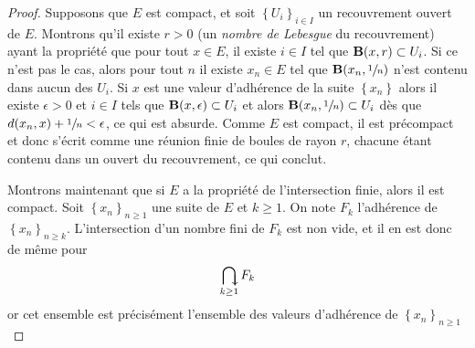\begin{proof}
    Supposons que $E$ est compact, et soit  $\left\{ U_i \right\} _{i \in  I}$ un recouvrement ouvert de $E$. Montrons qu'il existe  $r>0$ (un \emph{nombre de Lebesgue} du recouvrement) ayant la propriété que pour tout $x \in  E$, il existe $ i \in  I$ tel que $\mathbf B(x, r)\subset U_i$. Si ce n'est pas le cas, alors pour tout $n$ il existe  $x_n \in  E$ tel que $\mathbf B(x_n, \sfrac1n)$ n'est contenu dans aucun des $U_i$. Si  $x$ est une valeur d'adhérence de la suite  $\left\{ x_n \right\} $ alors il existe $\epsilon>0$ et $i \in  I$ tels que $\mathbf B(x, \epsilon)\subset U_i$ et alors $\mathbf B(x_n, \sfrac1n)\subset U_i$ dès que $d(x_n, x)+\sfrac1n<\epsilon$, ce qui est absurde. Comme $E$ est compact, il est précompact et donc s'écrit comme une réunion finie de boules de rayon  $r$, chacune étant contenu dans un ouvert du recouvrement, ce qui conclut.

    Montrons maintenant que si $E$ a la propriété de l'intersection finie, alors il est compact. Soit  $\left\{ x_n \right\} _{n\geq 1}$ une suite de $E$ et  $k\geq 1$. On note $F_k$ l'adhérence de  $\left\{ x_n \right\} _{n\geq k}$. L'intersection d'un nombre fini de $F_k$ est non vide, et il en est donc de même pour  \[
    \dbigcap_{k\geq 1} F_k
    \] 
    or cet ensemble est précisément l'ensemble des valeurs d'adhérence de $\left\{ x_n \right\}_{n\geq 1} $
\end{proof}
